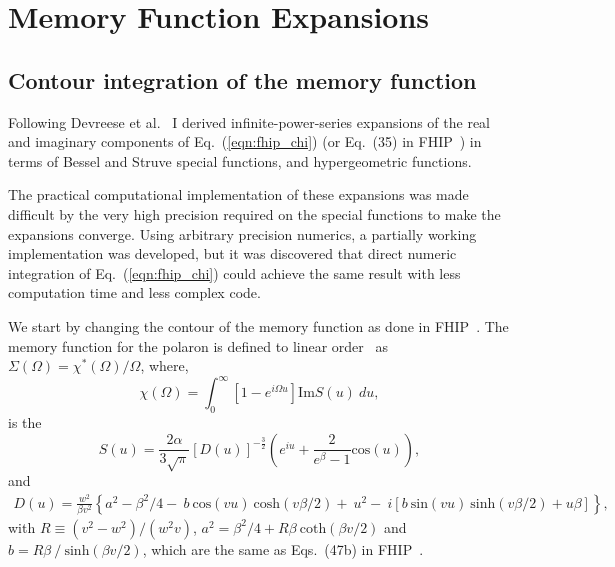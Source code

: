 \chapter{Memory Function Expansions}
\label{appx-3:memoryfunctions}

\section{Contour integration of the memory function} 

Following Devreese et al.~\cite{devreese_optical_1972} I derived infinite-power-series expansions of the real and imaginary components of Eq.~(\ref{eqn:fhip_chi}) (or Eq.~(35) in FHIP~\cite{feynman_mobility_1962}) in terms of Bessel and Struve special functions, and hypergeometric functions. 

The practical computational implementation of these expansions was made difficult by the very high precision required on the special functions to make the expansions converge. Using arbitrary precision numerics, a partially working implementation was developed, but it was discovered that direct numeric integration of Eq.~(\ref{eqn:fhip_chi}) could achieve the same result with less computation time and less complex code.

We start by changing the contour of the memory function as done in FHIP~\cite{feynman_mobility_1962}. The memory function for the polaron is defined to linear order~\cite{peeters_theory_1984} as $\Sigma(\Omega) = \chi^*(\Omega) / \Omega$, where,
\begin{equation}\label{eqn:memfunc}
    \chi(\Omega) = \int_0^\infty \left[ 1 - e^{i \Omega u} \right] \textrm{Im} S(u)\ du,
\end{equation}
is the 
\begin{equation}
    S(u) = \frac{2\alpha}{3\sqrt{\pi}} \left[D(u) \right]^{-\frac{3}{2}} \left( e^{iu} + \frac{2}{e^{\beta} - 1} \textrm{cos}(u) \right),
\end{equation}
and 
\begin{equation}
    \begin{gathered}
    D(u) = \frac{w^2}{\beta v^2} \left\{a^2 - \beta^2/4 -\ b\ \textrm{cos}(vu)\ \textrm{cosh}(v\beta/2) +\ u^2 -\ i \left[ b\ \textrm{sin}(vu)\ \textrm{sinh}(v\beta/2) + u\beta \right] \right\},
    \end{gathered}
\end{equation}
with $R \equiv (v^2 - w^2) / (w^2 v)$, $a^2 = \beta^2 / 4 + R \beta\ \textrm{coth}(\beta v / 2)$ and $b = R \beta\ /\ \textrm{sinh}(\beta v / 2)$, which are the same as Eqs.~(47b) in FHIP~\cite{feynman_mobility_1962}.

